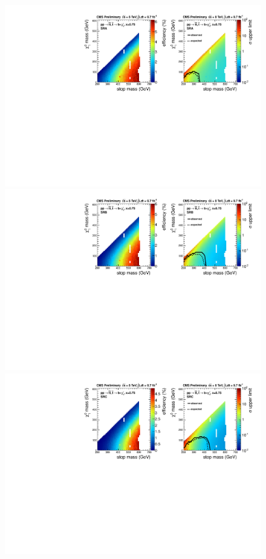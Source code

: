 \begin{figure}[hbt]
  \begin{center}
        \includegraphics[width=1.\linewidth]{plots/T2bw_x75_SRA.pdf}
        \includegraphics[width=1.\linewidth]{plots/T2bw_x75_SRB.pdf}
        \includegraphics[width=1.\linewidth]{plots/T2bw_x75_SRC.pdf}

\end{center}
\end{figure}
